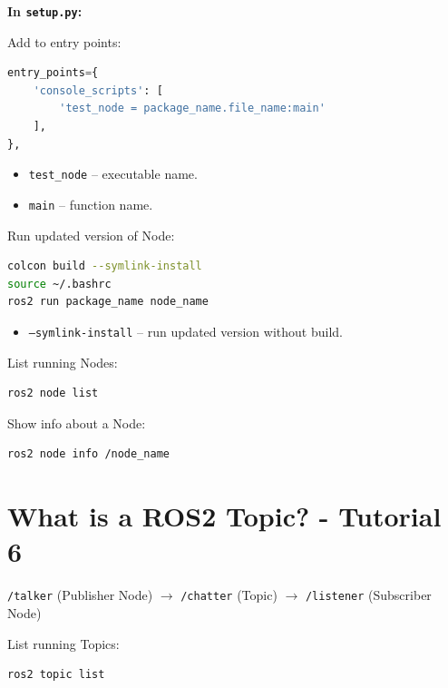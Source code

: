 \documentclass{article}
\newcommand{\code}[1]{\colorbox{codeBg}{\texttt{#1}}}
\begin{document}
\vspace{0.3cm}
\noindent \textbf{In \code{setup.py}:}

\vspace{0.1cm}
\noindent Add to entry points:
\begin{lstlisting}[style=pythonStyle, language=Python]
entry_points={
    'console_scripts': [
        'test_node = package_name.file_name:main'
    ],
},
\end{lstlisting}
\begin{itemize}
    \item \code{test\_node} -- executable name.
    \item \code{main} -- function name.
\end{itemize}

\vspace{0.3cm}
\noindent Run updated version of Node:
\begin{lstlisting}[style=bashStyle, language=bash]
colcon build --symlink-install
source ~/.bashrc
ros2 run package_name node_name
\end{lstlisting}
\begin{itemize}
    \item \code{--symlink-install} -- run updated version without build.
\end{itemize}

\vspace{0.3cm}
\noindent List running Nodes:
\begin{lstlisting}[style=bashStyle, language=bash]
ros2 node list
\end{lstlisting}

\noindent Show info about a Node:
\begin{lstlisting}[style=bashStyle, language=bash]
ros2 node info /node_name
\end{lstlisting}

\newpage

\section{What is a ROS2 Topic? - Tutorial 6}

\begin{warnbox}
\code{/talker} (Publisher Node) $\rightarrow$ \code{/chatter} (Topic) $\rightarrow$ \code{/listener} (Subscriber Node)
\end{warnbox}

\vspace{0.3cm}
\noindent List running Topics:
\begin{lstlisting}[style=bashStyle, language=bash]
ros2 topic list
\end{lstlisting}
\end{document}
